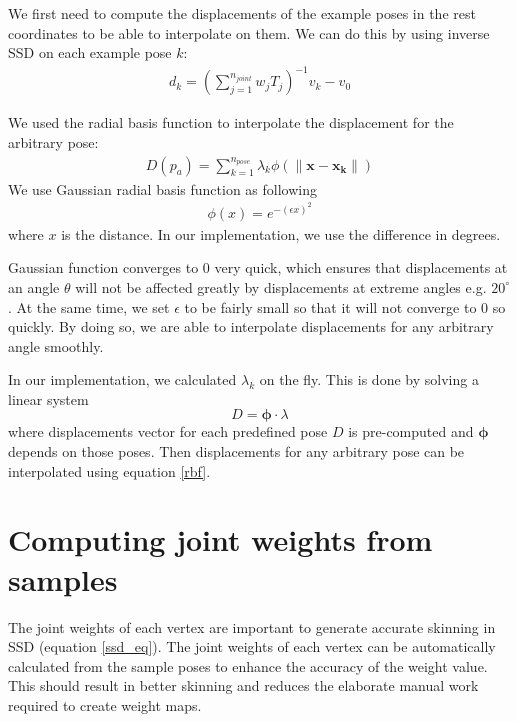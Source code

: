 \documentclass[11pt,twocolumn,letterpaper]{article}
\begin{document}
We first need to compute the displacements of the example poses in the rest coordinates to be able to interpolate on them. We can do this by using inverse SSD on each example pose $k$:
\begin{align} d_k = (\sum_{j=1}^{n_{joint}} w_j T_j)^{-1} v_k - v_0 \end{align}

We used the radial basis function \cite{lewis2000pose} to interpolate the displacement for the arbitrary pose:
\begin{align} D(p_a) = \sum_{k=1}^{n_{pose}} \lambda_k \phi(\| \mathbf{x} - \mathbf{x_k} \| ) 
\label{rbf}
\end{align}
We use Gaussian radial basis function as following
\begin{align} \phi(x) = e^{-(\epsilon x)^2} \end{align}
where $x$ is the distance. In our implementation, we use the difference in degrees.

Gaussian function converges to 0 very quick, which ensures that displacements at an angle $\theta$ will not be affected greatly by displacements at extreme angles e.g. $20^{\circ}$. At the same time, we set $\epsilon$ to be fairly small so that it will not converge to 0 so quickly. By doing so, we are able to interpolate displacements for any arbitrary angle smoothly.

In our implementation, we calculated $\lambda_k$ on the fly. This is done by solving a linear system 
\begin{equation}
	D=\boldsymbol{\phi}\cdot\lambda
\end{equation} 
where displacements vector for each predefined pose $D$ is pre-computed and $\boldsymbol{\phi}$ depends on those poses. Then displacements for any arbitrary pose can be interpolated using equation \ref{rbf}.

\section{Computing joint weights from samples}
The joint weights of each vertex are important to generate accurate skinning in SSD (equation \ref{ssd_eq}). The joint weights of each vertex can be automatically calculated from the sample poses to enhance the accuracy of the weight value. This should result in better skinning and reduces the elaborate manual work required to create weight maps.
\end{document}
